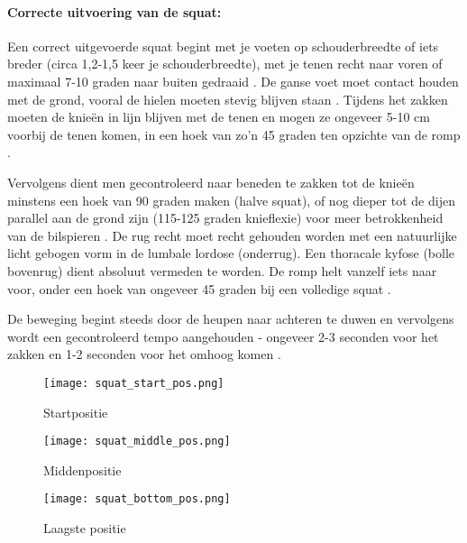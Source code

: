 \paragraph{Correcte uitvoering van de squat:}
Een correct uitgevoerde squat begint met je voeten op schouderbreedte of iets breder (circa 1,2-1,5 keer je schouderbreedte), met je tenen recht naar voren of maximaal 7-10 graden naar buiten gedraaid \autocite{LorenzettiEtAl2018}. 
De ganse voet moet contact houden met de grond, vooral de hielen moeten stevig blijven staan \autocite{CzaprowskiEtAl2012}. 
Tijdens het zakken moeten de knieën in lijn blijven met de tenen en mogen ze ongeveer 5-10 cm voorbij de tenen komen, in een hoek van zo'n 45 graden ten opzichte van de romp \autocite{LorenzettiEtAl2018}.

\medskip

Vervolgens dient men gecontroleerd naar beneden te zakken tot de knieën minstens een hoek van 90 graden maken (halve squat), of nog dieper tot de dijen parallel aan de grond zijn (115-125 graden knieflexie) voor meer betrokkenheid van de bilspieren \autocite{ComfortEtAl2018}. 
De rug recht moet recht gehouden worden met een natuurlijke licht gebogen vorm in de lumbale lordose (onderrug).
Een thoracale kyfose (bolle bovenrug) dient absoluut vermeden te worden.
De romp helt vanzelf iets naar voor, onder een hoek van ongeveer 45 graden bij een volledige squat \autocite{CzaprowskiEtAl2012}.

De beweging begint steeds door de heupen naar achteren te duwen en vervolgens wordt een gecontroleerd tempo aangehouden - ongeveer 2-3 seconden voor het zakken en 1-2 seconden voor het omhoog komen \autocite{CzaprowskiEtAl2012}.

\begin{figure}[h]
  \centering
  \begin{minipage}[t]{0.32\textwidth}
    \centering
    \texttt{[image: squat\_start\_pos.png]}
    \caption[Figuur 1]{\label{fig:squat_startpositie} Startpositie \autocite{RonaiEtAl2023}}
  \end{minipage}
  \hfill
  \begin{minipage}[t]{0.32\textwidth}
    \centering
    \texttt{[image: squat\_middle\_pos.png]}
    \caption[Figuur 2]{\label{fig:squat_middenpositie} Middenpositie \autocite{RonaiEtAl2023}}
  \end{minipage}
  \hfill
  \begin{minipage}[t]{0.32\textwidth}
    \centering
    \texttt{[image: squat\_bottom\_pos.png]}
    \caption[Figuur 3]{\label{fig:squat_onderpositie} Laagste positie \autocite{RonaiEtAl2023}}
  \end{minipage}
\end{figure}


